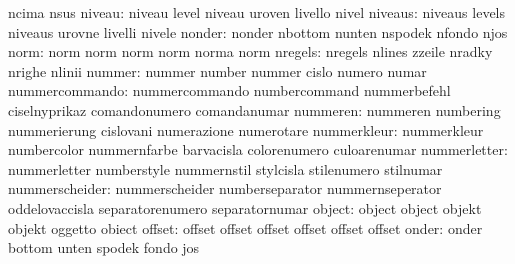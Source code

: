                            ncima                     nsus
                   niveau: niveau                    level
                           niveau                    uroven
                           livello                   nivel
                  niveaus: niveaus                   levels
                           niveaus                   urovne
                           livelli                   nivele
                   nonder: nonder                    nbottom
                           nunten                    nspodek
                           nfondo                    njos
                     norm: norm                      norm
                           norm                      norm
                           norma                     norm
                  nregels: nregels                   nlines
                           zzeile                    nradky
                           nrighe                    nlinii
                   nummer: nummer                    number
                           nummer                    cislo
                           numero                    numar
           nummercommando: nummercommando            numbercommand
                           nummerbefehl              ciselnyprikaz
                           comandonumero             comandanumar
                 nummeren: nummeren                  numbering
                           nummerierung              cislovani
                           numerazione               numerotare
              nummerkleur: nummerkleur               numbercolor
                           nummernfarbe              barvacisla
                           colorenumero              culoarenumar
             nummerletter: nummerletter              numberstyle
                           nummernstil               stylcisla
                           stilenumero               stilnumar
           nummerscheider: nummerscheider            numberseparator
                           nummernseperator          oddelovaccisla
                           separatorenumero          separatornumar
                   object: object                    object
                           objekt                    objekt
                           oggetto                   obiect
                   offset: offset                    offset
                           offset                    offset
                           offset                    offset
                    onder: onder                     bottom
                           unten                     spodek
                           fondo                     jos
